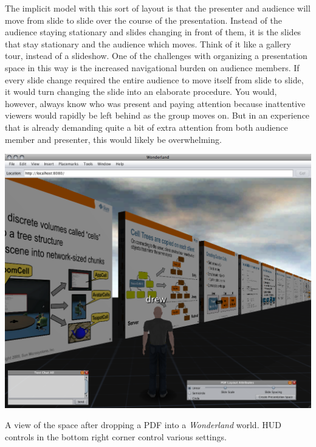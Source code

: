 The implicit model with this sort of layout is that the presenter and audience will move from slide to slide over the course of the presentation. Instead of the audience staying stationary and slides changing in front of them, it is the slides that stay stationary and the audience which moves. Think of it like a gallery tour, instead of a slideshow. One of the challenges with organizing a presentation space in this way is the increased navigational burden on audience members. If every slide change required the entire audience to move itself from slide to slide, it would turn changing the slide into an elaborate procedure. You would, however, always know who was present and paying attention because inattentive viewers would rapidly be left behind as the group moves on. But in an experience that is already demanding quite a bit of extra attention from both audience member and presenter, this would likely be overwhelming. 

\begin{marginfigure}
	\includegraphics{figures/pdf-spreader.png}
	\caption{A view of the space after dropping a PDF into a \emph{Wonderland} world. HUD controls in the bottom right corner control various settings.}
	\label{fig:pdf_spreader}
\end{marginfigure}


